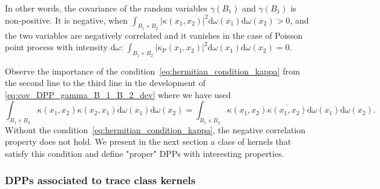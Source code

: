 \documentclass[twoside,11pt]{book}
\numberwithin{theorem}{chapter}
\numberwithin{definition}{chapter}
\numberwithin{proposition}{chapter}
\numberwithin{corollary}{chapter}
\numberwithin{example}{chapter}
\numberwithin{lemma}{chapter}
\numberwithin{assumption}{chapter}
\begin{document}
In other words, the covariance of the random variables $\gamma(B_1)$ and $\gamma(B_1)$ is non-positive. It is negative, when $\int_{B_{1} \times B_{2}} |\kappa(x_{1},x_{2})|^{2} \mathrm{d}\omega(x_1) \mathrm{d}\omega(x_2) >0$, and the two variables are negatively correlated and it vanishes in the case of Poisson point process with intensity $\mathrm{d}\omega$: $\int_{B_{1} \times B_{2}} |\kappa_{\mathrm{P}}(x_{1},x_{2})|^{2} \mathrm{d}\omega(x_1) \mathrm{d}\omega(x_2) = 0$.



Observe the importance of the condition~\ref{eq:hermitian_condition_kappa} from the second line to the third line in the development of \eqref{eq:cov_DPP_gamma_B_1_B_2_dev} where we have used
\begin{equation}
\int_{B_{1} \times B_{2}} \kappa(x_{1},x_{2}) \kappa(x_{2},x_{1}) \mathrm{d}\omega(x_{1}) \mathrm{d}\omega(x_{2}) = \int_{B_{1} \times B_{2}} \kappa(x_{1},x_{2}) \overline{\kappa(x_{1},x_{2})} \mathrm{d}\omega(x_{1}) \mathrm{d}\omega(x_{2}).
\end{equation}
Without the condition~\ref{eq:hermitian_condition_kappa}, the negative correlation property does not hold. We present in the next section a class of kernels that satisfy this condition and define "proper" DPPs with interesting properties. 




\subsubsection{DPPs associated to trace class kernels}




\end{document}
